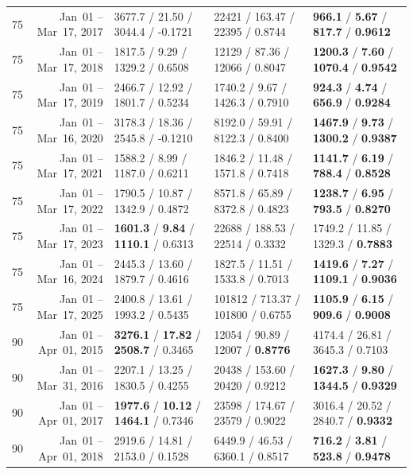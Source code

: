 \begin{longtable}{r r l l l}
75 & Jan~01 -- Mar~17, 2017 & 3677.7 / 21.50 / 3044.4 / -0.1721 & 22421 / 163.47 / 22395 / 0.8744 & \textbf{966.1} / \textbf{5.67} / \textbf{817.7} / \textbf{0.9612} \\
75 & Jan~01 -- Mar~17, 2018 & 1817.5 / 9.29 / 1329.2 / 0.6508 & 12129 / 87.36 / 12066 / 0.8047 & \textbf{1200.3} / \textbf{7.60} / \textbf{1070.4} / \textbf{0.9542} \\
75 & Jan~01 -- Mar~17, 2019 & 2466.7 / 12.92 / 1801.7 / 0.5234 & 1740.2 / 9.67 / 1426.3 / 0.7910 & \textbf{924.3} / \textbf{4.74} / \textbf{656.9} / \textbf{0.9284} \\
75 & Jan~01 -- Mar~16, 2020 & 3178.3 / 18.36 / 2545.8 / -0.1210 & 8192.0 / 59.91 / 8122.3 / 0.8400 & \textbf{1467.9} / \textbf{9.73} / \textbf{1300.2} / \textbf{0.9387} \\
75 & Jan~01 -- Mar~17, 2021 & 1588.2 / 8.99 / 1187.0 / 0.6211 & 1846.2 / 11.48 / 1571.8 / 0.7418 & \textbf{1141.7} / \textbf{6.19} / \textbf{788.4} / \textbf{0.8528} \\
75 & Jan~01 -- Mar~17, 2022 & 1790.5 / 10.87 / 1342.9 / 0.4872 & 8571.8 / 65.89 / 8372.8 / 0.4823 & \textbf{1238.7} / \textbf{6.95} / \textbf{793.5} / \textbf{0.8270} \\
75 & Jan~01 -- Mar~17, 2023 & \textbf{1601.3} / \textbf{9.84} / \textbf{1110.1} / 0.6313 & 22688 / 188.53 / 22514 / 0.3332 & 1749.2 / 11.85 / 1329.3 / \textbf{0.7883} \\
75 & Jan~01 -- Mar~16, 2024 & 2445.3 / 13.60 / 1879.7 / 0.4616 & 1827.5 / 11.51 / 1533.8 / 0.7013 & \textbf{1419.6} / \textbf{7.27} / \textbf{1109.1} / \textbf{0.9036} \\
75 & Jan~01 -- Mar~17, 2025 & 2400.8 / 13.61 / 1993.2 / 0.5435 & 101812 / 713.37 / 101800 / 0.6755 & \textbf{1105.9} / \textbf{6.15} / \textbf{909.6} / \textbf{0.9008} \\
\midrule
90 & Jan~01 -- Apr~01, 2015 & \textbf{3276.1} / \textbf{17.82} / \textbf{2508.7} / 0.3465 & 12054 / 90.89 / 12007 / \textbf{0.8776} & 4174.4 / 26.81 / 3645.3 / 0.7103 \\
90 & Jan~01 -- Mar~31, 2016 & 2207.1 / 13.25 / 1830.5 / 0.4255 & 20438 / 153.60 / 20420 / 0.9212 & \textbf{1627.3} / \textbf{9.80} / \textbf{1344.5} / \textbf{0.9329} \\
90 & Jan~01 -- Apr~01, 2017 & \textbf{1977.6} / \textbf{10.12} / \textbf{1464.1} / 0.7346 & 23598 / 174.67 / 23579 / 0.9022 & 3016.4 / 20.52 / 2840.7 / \textbf{0.9332} \\
90 & Jan~01 -- Apr~01, 2018 & 2919.6 / 14.81 / 2153.0 / 0.1528 & 6449.9 / 46.53 / 6360.1 / 0.8517 & \textbf{716.2} / \textbf{3.81} / \textbf{523.8} / \textbf{0.9478} \\

\end{longtable}
